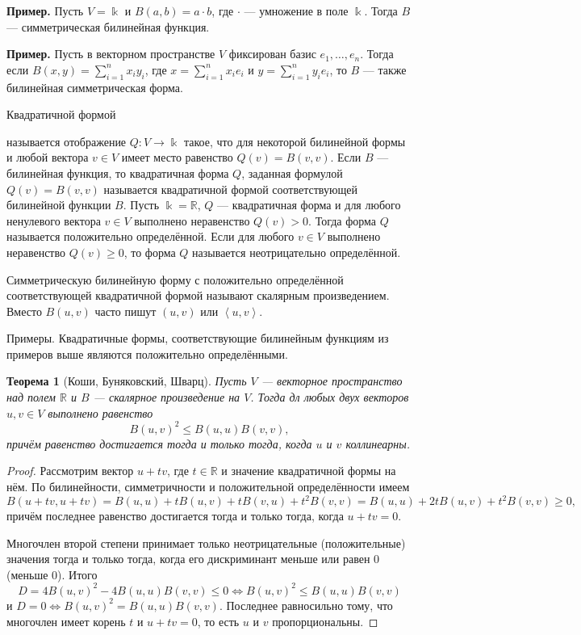\documentclass[12pt]{article}
\newtheorem{theorem}{Теорема}
\numberwithin{theorem}{section}
\theoremstyle{definition}
\newenvironment{example}{\indent \textbf{Пример.}}{\indent}
\newcommand{\defin}[2]{\hypertarget{#2}{{\color{red} #1}}}
\newcommand{\RR}{\mathbb{R}}
\begin{document}
	\begin{example}
		Пусть $ V = \Bbbk $ и $ B(a, b) = a \cdot b $, где $ \cdot $ --- умножение в поле $ \Bbbk $.
		Тогда $ B $ --- симметрическая билинейная функция.
	\end{example}
	
	\begin{example}
		Пусть в векторном пространстве $ V $
		фиксирован базис $ e_1, \ldots, e_n $. Тогда если $ B(x, y) = \sum\limits_{i = 1}^{n} x_iy_i $, где $ x = \sum\limits_{i = 1}^{n} x_ie_i $ и $ y = \sum\limits_{i = 1}^{n} y_ie_i $, то $ B $ --- также билинейная симметрическая форма.
	\end{example}
	
	\defin{Квадратичной формой}{quadratic} называется отображение $ Q \colon V \to \Bbbk $ такое, что для некоторой билинейной формы и любой вектора $ v \in V $ имеет место равенство $ Q(v) = B(v, v) $.
	Если $ B $ --- билинейная функция, то квадратичная форма $ Q $, заданная формулой $ Q(v) = B(v, v) $
	называется квадратичной формой соответствующей билинейной функции $ B $.
	Пусть $ \Bbbk = \RR $, $ Q $ --- квадратичная форма 
	и для любого ненулевого вектора $ v \in V $ выполнено неравенство $ Q(v) > 0 $.
	Тогда форма $ Q $ называется положительно определённой. 
	Если для любого $ v \in V $ выполнено неравенство $ Q(v) \geqslant 0 $,
	то форма $ Q $ называется неотрицательно определённой.

	Симметрическую билинейную форму с положительно определённой соответствующей квадратичной формой называют 
	\defin{скалярным произведением}{inner-product}. Вместо $ B(u,v) $ часто пишут $ (u, v) $ или $ \left<u, v\right> $.
	
	Примеры. Квадратичные формы, соответствующие билинейным функциям из примеров выше являются положительно определёнными.
	
	\begin{theorem}[Коши, Буняковский, Шварц] \label{Cauchy-real}
		Пусть $ V $ --- векторное пространство над полем $ \RR $ и $ B $ --- скалярное произведение на $ V $.
		Тогда дл любых двух векторов $ u, v \in V $ выполнено равенство
		$$ B(u, v)^2 \leqslant B(u,u)B(v,v), $$
		причём равенство достигается тогда и только тогда, когда $ u $ и $ v $ коллинеарны.
	\end{theorem}
	
	\begin{proof}
		Рассмотрим вектор $ u + tv $, где $ t \in \RR $ и значение квадратичной формы на нём.
		По билинейности, симметричности и положительной определённости имеем 
		$$ B(u + tv, u + tv) = B(u, u) + tB(u, v) + tB(v, u) + t^2B(v,v) = B(u,u) + 2tB(u,v) + t^2B(v,v) \geqslant 0, $$
		причём последнее равенство достигается тогда и только тогда, когда $ u + tv = 0 $.
		
		Многочлен второй степени принимает только неотрицательные (положительные) значения тогда и только тогда, когда его дискриминант меньше или равен 0 (меньше 0).
		Итого $$ D = 4B(u,v)^2 - 4B(u,u)B(v,v) \leqslant 0  \Leftrightarrow B(u,v)^2 \leqslant B(u,u)B(v,v) $$
		и $ D = 0 \Leftrightarrow B(u,v)^2 = B(u,u)B(v,v) $. Последнее равносильно тому, что многочлен имеет корень $ t $
		и $ u + tv = 0 $, то есть $ u $ и $ v $ пропорциональны.
	\end{proof}
	
\end{document}
